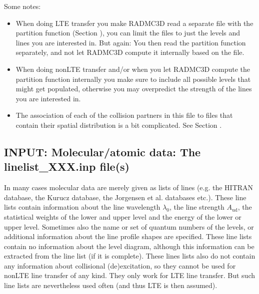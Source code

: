 \documentclass[letterpaper,10pt,english]{sphinxmanual}
\begin{document}
Some notes:
\begin{itemize}
\item {} 
When doing LTE transfer  you make RADMC\sphinxhyphen{}3D read a separate
file with the partition function (Section {\hyperref[\detokenize{lineradtrans:sec-partition-function}]{}}),
you can limit the  files to just the levels
and lines you are interested in. But again: You  then read the
partition function separately, and not let RADMC\sphinxhyphen{}3D compute it internally
based on the  file.

\item {} 
When doing non\sphinxhyphen{}LTE transfer and/or when you let RADMC\sphinxhyphen{}3D compute the
partition function internally you  make sure to include all
possible levels that might get populated, otherwise you may overpredict
the strength of the lines you are interested in.

\item {} 
The association of each of the collision partners in this file to
files that contain their spatial distribution is a bit complicated. See
Section {\hyperref[\detokenize{lineradtrans:sec-collpartner}]{}}.

\end{itemize}


\subsection{INPUT: Molecular/atomic data: The linelist\_XXX.inp file(s)}
\label{\detokenize{lineradtrans:input-molecular-atomic-data-the-linelist-xxx-inp-file-s}}\label{\detokenize{lineradtrans:sec-linelist-xxx-inp}}
In many cases molecular data are merely given as lists of lines (e.g. the
HITRAN database, the Kurucz database, the Jorgensen et al. databases
etc.). These line lists contain information about the line wavelength
\(\lambda_0\), the line strength \(A_{\mathrm{ud}}\), the statistical
weights of the lower and upper level and the energy of the lower or upper
level. Sometimes also the name or set of quantum numbers of the levels, or
additional information about the line profile shapes are specified. These line
lists contain no  information about the level diagram, although this
information can be extracted from the line list (if it is complete). These lines
lists also do not contain any information about collisional (de\sphinxhyphen{})excitation, so
they cannot be used for non\sphinxhyphen{}LTE line transfer of any kind. They only work for
LTE line transfer. But such line lists are nevertheless used often (and thus LTE
is then assumed).
\end{document}
